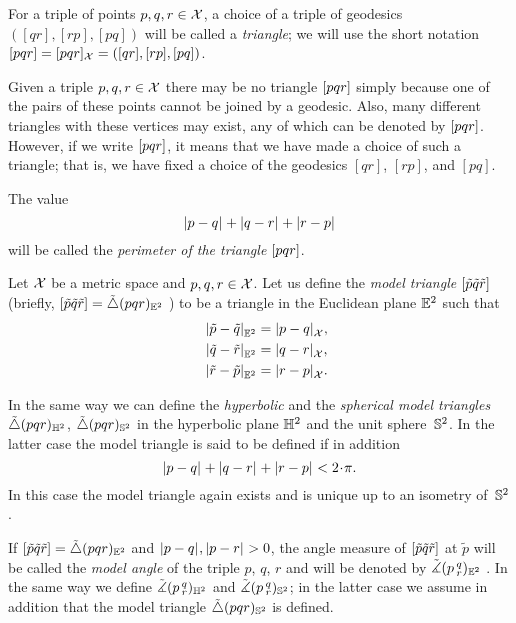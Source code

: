 For a triple of points $p,q,r\in \mathcal{X}$, a choice of a triple of geodesics $([q r], [r p], [p q])$ will be called a \emph{triangle}; we will use the short notation 
$[pqr]=[pqr]_{\mathcal{X}}=([q r], [r p], [p q])$\index{$\trig {{*}}{{*}}{{*}}$}.

Given a triple $p,q,r\in \mathcal{X}$ there may be no triangle 
$[pqr]$ simply because one of the pairs of these points cannot be joined by a geodesic.
Also, many different triangles with these vertices may exist, any of which can be denoted by $[pqr]$.
However, if we write $[pqr]$, it means that we have made a choice of such a triangle; 
that is, we have  fixed a choice of the geodesics $[q r]$, $[r p]$, and $[p q]$.

The value 
\[\dist{p}{q}{}+\dist{q}{r}{}+\dist{r}{p}{}\]
will be called the {}\emph{perimeter of the triangle} $[pqr]$.

Let $\mathcal{X}$ be a metric space and 
$p,q,r\in \mathcal{X}$. 
Let us define the \emph{model triangle} $[\tilde p\tilde q\tilde r]$ 
(briefly, 
$[\tilde p\tilde q\tilde r]=\tilde\triangle(p q r)_{\mathbb{E}^2}$%
) to be a triangle in the Euclidean plane $\mathbb{E}^2$ such that
\begin{align*}\dist{\tilde p}{\tilde q}{\EE^2}&=\dist{p}{q}{\spc{X}},
\\
\quad\dist{\tilde q}{\tilde r}{\EE^2}&=\dist{q}{r}{\spc{X}},
\\
\quad\dist{\tilde r}{\tilde p}{\EE^2}&=\dist{r}{p}{\spc{X}}.
\end{align*}

In the same way we can define the \emph{hyperbolic} and the \emph{spherical model triangles} $\tilde\triangle(p q r)_{\mathbb{H}^2}$, $\tilde\triangle(p q r)_{\mathbb{S}^2}$
in the hyperbolic plane $\mathbb{H}^2$ and the unit sphere~$\mathbb{S}^2$.
In the latter case the model triangle is said to be defined if in addition
\[\dist{p}{q}{}+\dist{q}{r}{}+\dist{r}{p}{}< 2\cdot\pi.\]
In this case the model triangle again exists and is unique up to an isometry of~$\mathbb{S}^2$.

If 
$[\tilde p\tilde q\tilde r]=\tilde\triangle(p q r)_{\mathbb{E}^2}$ 
and $\dist{p}{q}{},\dist{p}{r}{}>0$, 
the angle measure of 
$[\tilde p\tilde q\tilde r]$ at $\tilde p$ 
will be called the \emph{model angle} of the triple $p$, $q$, $r$ and will be denoted by
$\tilde\measuredangle(p\,{}^{q}_{r})_{\mathbb{E}^2}$%
\index{$\tilde\measuredangle$!$\angk{{*}}{{*}}{{*}}$}.
In the same way we define $\tilde\measuredangle(p\,{}^{q}_{r})_{\mathbb{H}^2}$ and $\tilde\measuredangle(p\,{}^{q}_{r})_{\mathbb{S}^2}$;
in the latter case  we assume in addition that the model triangle $\tilde\triangle(p q r)_{\mathbb{S}^2}$ is defined.

